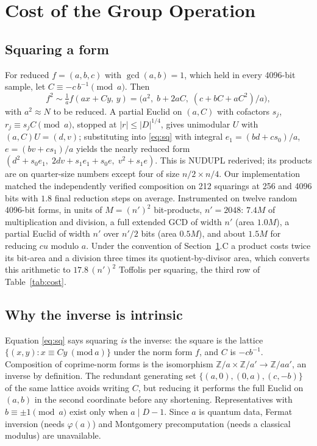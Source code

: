 \documentclass[conference]{IEEEtran}
\newcommand{\Z}{\mathbb{Z}}
\begin{document}
\section{Cost of the Group Operation}\label{sec:cost}
\subsection{Squaring a form}
For reduced $f=(a,b,c)$ with $\gcd(a,b)=1$, which held in every 4096-bit sample, let $C\equiv-c\,b^{-1}\pmod a$. Then
\begin{equation}\label{eq:sq}
f^2\sim\tfrac1a f(ax+Cy,\,y)=\big(a^2,\;b+2aC,\;(c+bC+aC^2)/a\big),
\end{equation}
with $a^2\approx N$ to be reduced. A partial Euclid on $(a,C)$ with cofactors $s_j$, $r_j\equiv s_jC\pmod a$, stopped at $|r|\le|D|^{1/4}$, gives unimodular $U$ with $(a,C)U=(d,v)$; substituting into \eqref{eq:sq} with integral $e_1=(bd+cs_0)/a$, $e=(bv+cs_1)/a$ yields the nearly reduced form $(d^2+s_0e_1,\;2dv+s_1e_1+s_0e,\;v^2+s_1e)$. This is NUDUPL \cite{jacobson2002} rederived; its products are on quarter-size numbers except four of size $n/2\times n/4$. Our implementation matched the independently verified composition on 212 squarings at 256 and 4096 bits with $1.8$ final reduction steps on average. Instrumented on twelve random 4096-bit forms, in units of $M=(n')^2$ bit-products, $n'=2048$: $7.4M$ of multiplication and division, a full extended GCD of width $n'$ (area $1.0M$), a partial Euclid of width $n'$ over $n'/2$ bits (area $0.5M$), and about $1.5M$ for reducing $cu$ modulo $a$. Under the convention of Section~\ref{sec:cost}.C a product costs twice its bit-area and a division three times its quotient-by-divisor area, which converts this arithmetic to $17.8\,(n')^2$ Toffolis per squaring, the third row of Table~\ref{tab:cost}.

\subsection{Why the inverse is intrinsic}
Equation \eqref{eq:sq} says squaring \emph{is} the inverse: the square is the lattice $\{(x,y):x\equiv Cy\ (\mathrm{mod}\ a)\}$ under the norm form $f$, and $C$ is $-cb^{-1}$. Composition of coprime-norm forms is the isomorphism $\Z/a\times\Z/a'\to\Z/aa'$, an inverse by definition. The redundant generating set $\{(a,0),(0,a),(c,-b)\}$ of the same lattice avoids writing $C$, but reducing it performs the full Euclid on $(a,b)$ in the second coordinate before any shortening. Representatives with $b\equiv\pm1\pmod a$ exist only when $a\mid D-1$. Since $a$ is quantum data, Fermat inversion (needs $\varphi(a)$) and Montgomery precomputation (needs a classical modulus) are unavailable.
\end{document}
